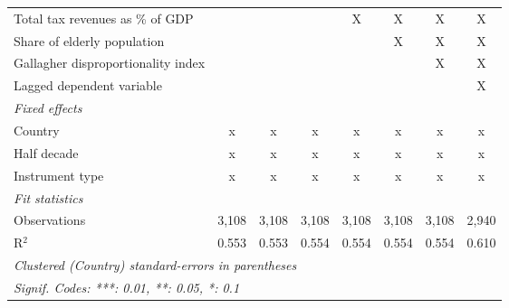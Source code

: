 \begin{table}[htbp]
\begin{tabular}{lccccccc}
      Total tax revenues as \% of GDP                                          &               &               &               & X             & X             & X             & X\\  
      Share of elderly population                                              &               &               &               &               & X             & X             & X\\  
      Gallagher disproportionality index                                       &               &               &               &               &               & X             & X\\  
      Lagged dependent variable                                                &               &               &               &               &               &               & X\\  
      \emph{Fixed effects}\\
      Country                                                                  & x             & x             & x             & x             & x             & x             & x\\  
      Half decade                                                              & x             & x             & x             & x             & x             & x             & x\\  
      Instrument type                                                          & x             & x             & x             & x             & x             & x             & x\\  
      \midrule \emph{Fit statistics}\\
      Observations                                                             & 3,108         & 3,108         & 3,108         & 3,108         & 3,108         & 3,108         & 2,940\\  
      R$^2$                                                                    & 0.553         & 0.553         & 0.554         & 0.554         & 0.554         & 0.554         & 0.610\\  
      \midrule
      \multicolumn{8}{l}{\emph{Clustered (Country) standard-errors in parentheses}}\\
      \multicolumn{8}{l}{\emph{Signif. Codes: ***: 0.01, **: 0.05, *: 0.1}}\\
   \end{tabular}
\end{table}


